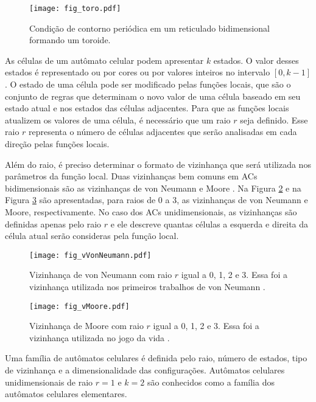	\begin{figure}[h!]
	  \centering
  	  \texttt{[image: fig\_toro.pdf]}
	  \caption{Condição de contorno periódica em um reticulado bidimensional formando um toroide.}
	  \label{fig:toro}
	\end{figure}


As células de um autômato celular podem apresentar $k$ estados. O valor desses estados é representado ou por cores ou por valores inteiros no intervalo $[0, k-1]$. O estado de uma célula pode ser modificado pelas funções locais, que são o conjunto de regras que determinam o novo valor de uma célula baseado em seu estado atual e nos estados das células adjacentes. Para que as funções locais atualizem os valores de uma célula, é necessário que um raio $r$ seja definido. Esse raio $r$ representa o número de células adjacentes que serão analisadas em cada direção pelas funções locais.

Além do raio, é preciso determinar o formato de vizinhança que será utilizada nos parâmetros da função local. Duas vizinhanças bem comuns em ACs bidimensionais são as vizinhanças de von Neumann \cite{weisstein2015b} e Moore \cite{weisstein2015c}. Na Figura \ref{fig:vVonNeumann} e na Figura \ref{fig:vMoore} são apresentadas, para raios de 0 a 3, as vizinhanças de von Neumann e Moore, respectivamente. No caso dos ACs unidimensionais, as vizinhanças são definidas apenas pelo raio $r$ e ele descreve quantas células a esquerda e direita da célula atual serão consideras pela função local.

	\begin{figure}[h!]
	  \centering
	  \texttt{[image: fig\_vVonNeumann.pdf]}
	  \caption{Vizinhança de von Neumann com raio $r$ igual a 0, 1, 2 e 3. Essa foi a vizinhança utilizada nos primeiros trabalhos de von Neumann \cite{weisstein2015b}.}
	  \label{fig:vVonNeumann}
	\end{figure}

	\begin{figure}[h!]
	  \centering
  	  \texttt{[image: fig\_vMoore.pdf]}
	  \caption{Vizinhança de Moore com raio $r$ igual a 0, 1, 2 e 3. Essa foi a vizinhança utilizada no jogo da vida \cite{weisstein2015c}.}
	  \label{fig:vMoore}
	\end{figure}

Uma família de autômatos celulares é definida pelo raio, número de estados, tipo de vizinhança e a dimensionalidade das configurações. Autômatos celulares unidimensionais de raio $r=1$ e $k=2$ são conhecidos como a família dos autômatos celulares elementares.

